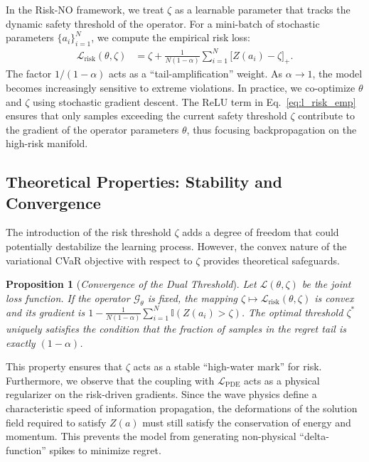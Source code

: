 \documentclass{article}
\newcommand{\Lrisk}{\mathcal{L}_{\text{risk}}}
\theoremstyle{plain}
\newtheorem{proposition}[theorem]{Proposition}
\theoremstyle{definition}
\theoremstyle{remark}
\begin{document}
In the Risk-NO framework, we treat $\zeta$ as a learnable parameter that tracks the dynamic safety threshold of the operator. For a mini-batch of stochastic parameters $\{a_i\}_{i=1}^N$, we compute the empirical risk loss:
\begin{equation}
\begin{aligned}
    \Lrisk(\theta,\zeta)
    &=
    \zeta
      + \frac{1}{N(1-\alpha)} \sum_{i=1}^N
        \big[ Z(a_i) - \zeta \big]_+.
\end{aligned}
    \label{eq:l_risk_emp}
\end{equation}
The factor $1/(1-\alpha)$ acts as a ``tail-amplification'' weight. As $\alpha \to 1$, the model becomes increasingly sensitive to extreme violations. In practice, we co-optimize $\theta$ and $\zeta$ using stochastic gradient descent. The ReLU term in Eq.~\eqref{eq:l_risk_emp} ensures that only samples exceeding the current safety threshold $\zeta$ contribute to the gradient of the operator parameters $\theta$, thus focusing backpropagation on the high-risk manifold.

\subsection{Theoretical Properties: Stability and Convergence}
\label{sec:theory}

The introduction of the risk threshold $\zeta$ adds a degree of freedom that could potentially destabilize the learning process. However, the convex nature of the variational CVaR objective with respect to $\zeta$ provides theoretical safeguards.

\begin{proposition}[\textit{Convergence of the Dual Threshold}]
\label{prop:zeta_conv}
Let $\mathcal{L}(\theta, \zeta)$ be the joint loss function. If the operator $\mathcal{G}_\theta$ is fixed, the mapping $\zeta \mapsto \Lrisk(\theta, \zeta)$ is convex and its gradient is $1 - \frac{1}{N(1-\alpha)} \sum_{i=1}^N \mathbb{I}(Z(a_i) > \zeta)$. The optimal threshold $\zeta^*$ uniquely satisfies the condition that the fraction of samples in the regret tail is exactly $(1-\alpha)$.
\end{proposition}

This property ensures that $\zeta$ acts as a stable ``high-water mark'' for risk. Furthermore, we observe that the coupling with $\mathcal{L}_{\text{PDE}}$ acts as a physical regularizer on the risk-driven gradients. Since the wave physics define a characteristic speed of information propagation, the deformations of the solution field required to satisfy $Z(a)$ must still satisfy the conservation of energy and momentum. This prevents the model from generating non-physical ``delta-function'' spikes to minimize regret.
\end{document}
